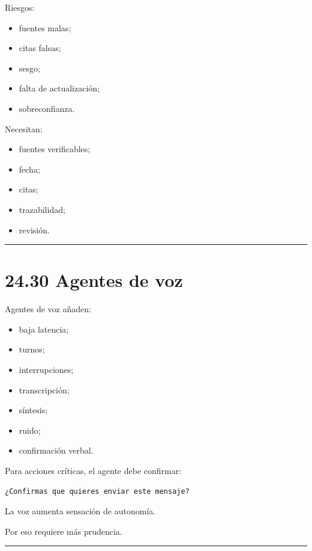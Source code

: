 Riesgos:

\begin{itemize}
\tightlist
\item
  fuentes malas;
\item
  citas falsas;
\item
  sesgo;
\item
  falta de actualización;
\item
  sobreconfianza.
\end{itemize}

Necesitan:

\begin{itemize}
\tightlist
\item
  fuentes verificables;
\item
  fecha;
\item
  citas;
\item
  trazabilidad;
\item
  revisión.
\end{itemize}

\begin{center}\rule{0.5\linewidth}{0.5pt}\end{center}

\section{24.30 Agentes de voz}\label{agentes-de-voz-1}

Agentes de voz añaden:

\begin{itemize}
\tightlist
\item
  baja latencia;
\item
  turnos;
\item
  interrupciones;
\item
  transcripción;
\item
  síntesis;
\item
  ruido;
\item
  confirmación verbal.
\end{itemize}

Para acciones críticas, el agente debe confirmar:

\begin{lstlisting}
¿Confirmas que quieres enviar este mensaje?
\end{lstlisting}

La voz aumenta sensación de autonomía.

Por eso requiere más prudencia.

\begin{center}\rule{0.5\linewidth}{0.5pt}\end{center}

